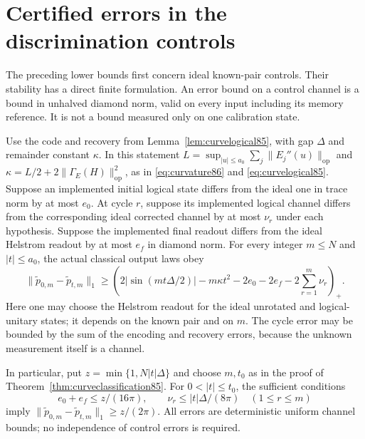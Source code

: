 \section{Certified errors in the discrimination controls}
\label{sec:controlstability85}
The preceding lower bounds first concern ideal known-pair controls.
Their stability has a direct finite formulation.  An error bound on a
control channel is a bound in unhalved diamond norm, valid on every
input including its memory reference.  It is not a bound measured only
on one calibration state.

\begin{theorem}\label{thm:controlstability85}
Use the code and recovery from Lemma~\ref{lem:curvelogical85}, with
gap $\Delta$ and remainder constant $\kappa$.
In this statement
$L=\sup_{|u|\le a_0}\sum_j\|E_j''(u)\|_{\mathrm{op}}$ and
$\kappa=L/2+2\|\Gamma_E(H)\|_{\mathrm{op}}^2$, as in
\eqref{eq:curvature86} and \eqref{eq:curvelogical85}.
Suppose an implemented initial logical state differs from the ideal
one in trace norm by at most $e_0$.  At cycle $r$, suppose its
implemented logical channel differs from the corresponding ideal
corrected channel by at most $\nu_r$ under each hypothesis.
Suppose the implemented final readout differs from the ideal
Helstrom readout by at most $e_f$ in diamond norm.
For every integer $m\le N$ and $|t|\le a_0$, the actual classical
output laws obey
\begin{equation}\label{eq:controlledger85}
 \|\widetilde p_{0,m}-\widetilde p_{t,m}\|_1
 \ge\left(2|\sin(mt\Delta/2)|-m\kappa t^2
              -2e_0-2e_f-2\sum_{r=1}^m\nu_r\right)_+.
\end{equation}
Here one may choose the Helstrom readout for the ideal unrotated and
logical-unitary states; it depends on the known pair and on $m$.
The cycle error may be bounded by the sum of the encoding and recovery
errors, because the unknown measurement itself is a channel.

In particular, put $z=\min\{1,N|t|\Delta\}$ and choose $m,t_0$
as in the proof of Theorem~\ref{thm:curveclassification85}.
For $0<|t|\le t_0$, the sufficient conditions
\begin{equation}\label{eq:controlprecision85}
 e_0+e_f\le z/(16\pi),\qquad
 \nu_r\le |t|\Delta/(8\pi)\quad(1\le r\le m)
\end{equation}
imply
$\|\widetilde p_{0,m}-\widetilde p_{t,m}\|_1\ge z/(2\pi)$.
All errors are deterministic uniform channel bounds; no independence
of control errors is required.
\end{theorem}

